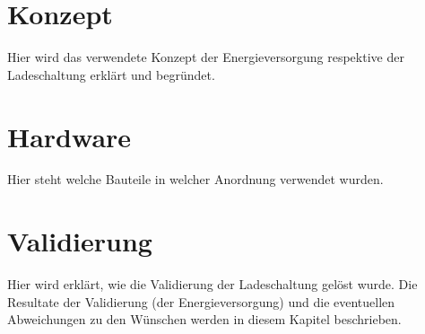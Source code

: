 \section{Konzept}
Hier wird das verwendete Konzept der Energieversorgung respektive der Ladeschaltung erklärt und begründet. 
\section{Hardware}
Hier steht welche Bauteile in welcher Anordnung verwendet wurden.
\section{Validierung}
Hier wird erklärt, wie die Validierung der Ladeschaltung gelöst wurde. Die Resultate der Validierung (der Energieversorgung) und die eventuellen Abweichungen zu den Wünschen werden in diesem Kapitel beschrieben.